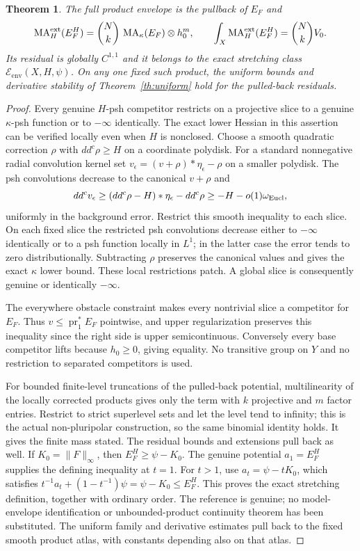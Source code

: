 \documentclass[11pt]{article}
\newcommand{\D}{dd^c}
\newcommand{\MA}{\operatorname{MA}}
\newcommand{\Eenv}{\mathcal E_{\mathrm{env}}}
\newtheorem{theorem}{Theorem}
\theoremstyle{remark}\newtheorem{remark}[theorem]{Remark}
\begin{document}
\begin{theorem}\label{th:product}
The full product envelope is the pullback of $E_F$ and
\[
 \MA_H^{\rm ext}(E_F^H)=
       \binom Nk\,\MA_\kappa(E_F)\otimes h_0^m,
 \qquad \int_X\MA_H^{\rm ext}(E_F^H)=\binom Nk V_0.
\]
Its residual is globally $C^{1,1}$ and it belongs to the exact
stretching class $\Eenv(X,H,\psi)$. On any one fixed such product,
the uniform bounds and derivative stability of
Theorem~\ref{th:uniform} hold for the pulled-back residuals.
\end{theorem}
\begin{proof}
Every genuine $H$-psh competitor restricts on a projective slice to a
genuine $\kappa$-psh function or to $-\infty$ identically. The exact
lower Hessian in this assertion can be verified locally even when
$H$ is nonclosed. Choose a smooth quadratic correction $\rho$ with
$\D\rho\geq H$ on a coordinate polydisk. For a standard nonnegative
radial convolution kernel set
$v_\epsilon=(v+\rho)*\eta_\epsilon-\rho$ on a smaller polydisk.
The psh convolutions decrease to the canonical $v+\rho$ and
\[
 \D v_\epsilon\geq(\D\rho-H)*\eta_\epsilon-\D\rho
       \geq-H-o(1)\omega_{\rm Eucl},
\]
uniformly in the background error. Restrict this smooth inequality
to each slice. On each fixed slice the restricted psh convolutions
decrease either to $-\infty$ identically or to a psh function locally
in $L^1$; in the latter case the error tends to zero distributionally.
Subtracting $\rho$ preserves the canonical values and gives the exact
$\kappa$ lower bound. These local restrictions patch. A global slice
is consequently genuine or identically $-\infty$.

The everywhere obstacle constraint makes every nontrivial slice a
competitor for $E_F$. Thus $v\leq\operatorname{pr}_1^*E_F$ pointwise,
and upper regularization preserves this inequality since the right
side is upper semicontinuous. Conversely every base competitor lifts
because $h_0\geq0$, giving equality. No transitive group on $Y$ and
no restriction to separated competitors is used.

For bounded finite-level truncations of the pulled-back potential,
multilinearity of the locally corrected products gives only the term
with $k$ projective and $m$ factor entries. Restrict to strict
superlevel sets and let the level tend to infinity; this is the
actual non-pluripolar construction, so the same binomial identity
holds. It gives the finite mass stated. The residual bounds and
extensions pull back as well. If $K_0=\|F\|_\infty$, then
$E_F^H\geq\psi-K_0$. The genuine potential $a_1=E_F^H$ supplies
the defining inequality at $t=1$. For $t>1$, use $a_t=\psi-tK_0$, which satisfies
$t^{-1}a_t+(1-t^{-1})\psi=\psi-K_0\leq E_F^H$.
This proves the exact stretching definition, together with ordinary
order. The reference is genuine; no model-envelope identification
or unbounded-product continuity theorem has been substituted.
The uniform family and derivative estimates pull back to the fixed
smooth product atlas, with constants depending also on that atlas.
\end{proof}
\end{document}
